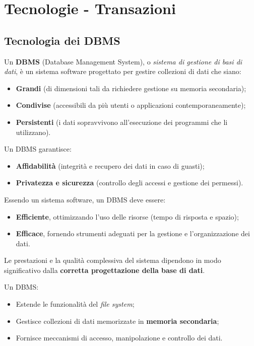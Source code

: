 \section{Tecnologie - Transazioni}
\subsection{Tecnologia dei DBMS}
Un \textbf{DBMS} (Database Management System), o \textit{sistema di gestione di basi di dati}, 
è un sistema software progettato per gestire collezioni di dati che siano:

\begin{itemize}
	\item \textbf{Grandi} (di dimensioni tali da richiedere gestione su memoria secondaria);
	\item \textbf{Condivise} (accessibili da più utenti o applicazioni contemporaneamente);
	\item \textbf{Persistenti} (i dati sopravvivono all'esecuzione dei programmi che li utilizzano).
\end{itemize}

Un DBMS garantisce:
\begin{itemize}
	\item \textbf{Affidabilità} (integrità e recupero dei dati in caso di guasti);
	\item \textbf{Privatezza e sicurezza} (controllo degli accessi e gestione dei permessi).
\end{itemize}

Essendo un sistema software, un DBMS deve essere:
\begin{itemize}
	\item \textbf{Efficiente}, ottimizzando l’uso delle risorse (tempo di risposta e spazio);
	\item \textbf{Efficace}, fornendo strumenti adeguati per la gestione e l’organizzazione dei dati.
\end{itemize}

Le prestazioni e la qualità complessiva del sistema dipendono in modo significativo 
dalla \textbf{corretta progettazione della base di dati}.

Un DBMS:
\begin{itemize}
	\item Estende le funzionalità del \textit{file system};
	\item Gestisce collezioni di dati memorizzate in \textbf{memoria secondaria};
	\item Fornisce meccanismi di accesso, manipolazione e controllo dei dati.
\end{itemize}

